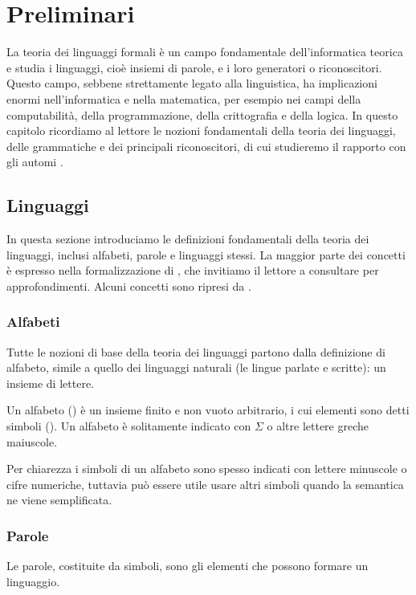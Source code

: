 \chapter{Preliminari}
La teoria dei linguaggi formali è un campo fondamentale dell'informatica teorica e studia i linguaggi, cioè insiemi di parole, e i loro generatori o riconoscitori. Questo campo, sebbene strettamente legato alla linguistica, ha implicazioni enormi nell'informatica e nella matematica, per esempio nei campi della computabilità, della programmazione, della crittografia e della logica. In questo capitolo ricordiamo al lettore le nozioni fondamentali della teoria dei linguaggi, delle grammatiche e dei principali riconoscitori, di cui studieremo il rapporto con gli automi .



\section{Linguaggi}
In questa sezione introduciamo le definizioni fondamentali della teoria dei linguaggi, inclusi alfabeti, parole e linguaggi stessi. La maggior parte dei concetti è espresso nella formalizzazione di \cite{Hopcroft:01:introLFA2}, che invitiamo il lettore a consultare per approfondimenti. Alcuni concetti sono ripresi da \cite{Bertoni:04:dispLFA}.


\subsection*{Alfabeti}
Tutte le nozioni di base della teoria dei linguaggi partono dalla definizione di alfabeto, simile a quello dei linguaggi naturali (le lingue parlate e scritte): un insieme di lettere.
\begin{defin}[alfabeto]
	Un alfabeto () è un insieme finito e non vuoto arbitrario, i cui elementi sono detti simboli (). Un alfabeto è solitamente indicato con $\Sigma$ o altre lettere greche maiuscole.
\end{defin}
Per chiarezza i simboli di un alfabeto sono spesso indicati con lettere minuscole o cifre numeriche, tuttavia può essere utile usare altri simboli quando la semantica ne viene semplificata.


\subsection*{Parole}
Le parole, costituite da simboli, sono gli elementi che possono formare un linguaggio.

